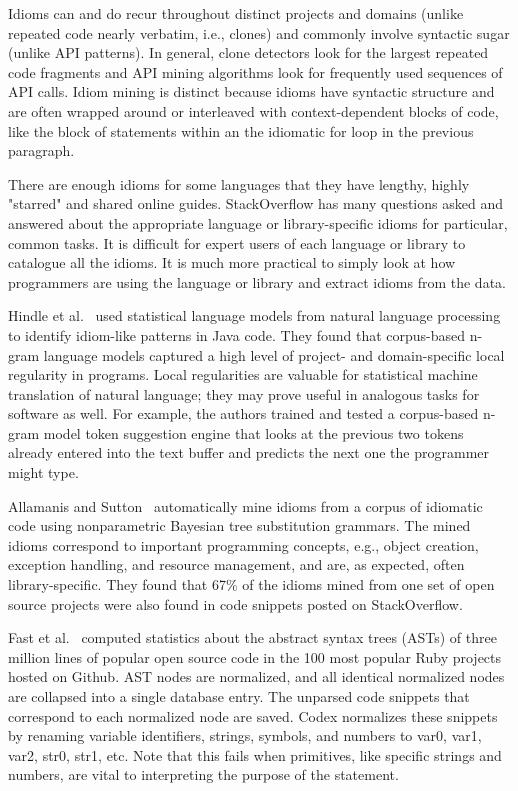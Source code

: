 Idioms can and do recur throughout distinct projects and domains (unlike repeated code nearly verbatim, i.e., clones) and commonly involve syntactic sugar (unlike API patterns). In general, clone detectors look for the largest repeated code fragments and API mining algorithms look for frequently used sequences of API calls. Idiom mining is distinct because idioms have syntactic structure and are often wrapped around or interleaved with context-dependent blocks of code, like the block of statements within an the idiomatic for loop in the previous paragraph.

There are enough idioms for some languages that they have lengthy, highly "starred" and shared online guides. StackOverflow has many questions asked and answered about the appropriate language or library-specific idioms for particular, common tasks. It is difficult for expert users of each language or library to catalogue all the idioms. It is much more practical to simply look at how programmers are using the language or library and extract idioms from the data.

Hindle et al.~\cite{Hindle2012} used statistical language models from natural language processing to identify idiom-like patterns in Java code. They found that corpus-based n-gram language models captured a high level of project- and domain-specific local regularity in programs. Local regularities are valuable for statistical machine translation of natural language; they may prove useful in analogous tasks for software as well. For example, the authors trained and tested a corpus-based n-gram model token suggestion engine that looks at the previous two tokens already entered into the text buffer and predicts the next one the programmer might type.

Allamanis and Sutton~\cite{allamanis2014mining} automatically mine idioms from a corpus of idiomatic code using nonparametric Bayesian tree substitution grammars. The mined idioms correspond to important programming concepts, e.g., object creation, exception handling, and resource management, and are, as expected, often library-specific. They found that 67\% of the idioms mined from one set of open source projects were also found in code snippets posted on StackOverflow.

Fast et al.~\cite{codex} computed statistics about the abstract syntax trees (ASTs) of three million lines of popular open source code in the 100 most popular Ruby projects hosted on Github. AST nodes are normalized, and all identical normalized nodes are collapsed into a single database entry. The unparsed code snippets that correspond to each normalized node are saved. Codex normalizes these snippets by renaming variable identifiers, strings, symbols, and numbers to var0, var1, var2, str0, str1, etc. Note that this fails when primitives, like specific strings and numbers, are vital to interpreting the purpose of the statement.

